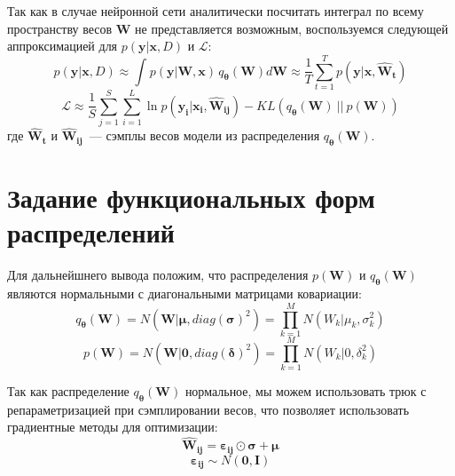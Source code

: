 \documentclass{article}
\numberwithin{equation}{section}
\begin{document}
    Так как в случае нейронной сети аналитически посчитать интеграл
    по всему пространству весов $\pmb{W}$ не представляется возможным,
    воспользуемся следующей аппроксимацией для $p(\pmb{y} | \pmb{x}, D)$ и $\mathcal{L}$:
    \begin{equation}
        p(\pmb{y} | \pmb{x}, D)
        \approx
            \int_{}{
                p(\pmb{y} | \pmb{W}, \pmb{x})
                \,
                q_{\pmb{\theta}}(\pmb{W})
                d\pmb{W}
            }
        \approx
            \frac{1}{T} \sum_{t=1}^{T}{
                p(\pmb{y} | \pmb{x}, \pmb{\hat{W}_{t}})
            }
    \end{equation}
    \begin{equation}\label{elbo_init}
        \mathcal{L}
        \approx
            \frac{1}{S} \sum_{j=1}^S \sum_{i=1}^{L} {
                \ln{
                    p(\pmb{y_{i}} | \pmb{x_{i}}, \pmb{\hat{W}_{ij}})
                }
            }
            -
            KL(q_{\pmb{\theta}}(\pmb{W})~||~p(\pmb{W}))
    \end{equation}
    где $\pmb{\hat{W}_{t}}$ и $\pmb{\hat{W}_{ij}}$~--- сэмплы весов модели из распределения
    $q_{\pmb{\theta}}(\pmb{W})$.

    \section{Задание функциональных форм распределений}
    Для дальнейшнего вывода положим,
    что распределения $p(\pmb{W})$ и $q_{\pmb{\theta}}(\pmb{W})$
    являются нормальными с диагональными матрицами ковариации:
    \begin{equation}
        q_{\pmb{\theta}}(\pmb{W})
        =
            N(
                \pmb{W} | \pmb{\mu}, diag(\pmb{\sigma})^{2}
            )
        =
            \prod_{k=1}^M
            N(
                W_k | \mu_k, \sigma_k^2
            )
    \end{equation}
    \begin{equation}
        p(\pmb{W})
        =
            N(
                \pmb{W} | \pmb{0}, diag(\pmb{\delta})^{2}
            )
        =
            \prod_{k=1}^M
            N(
                W_k | 0, \delta_k^2
            )
    \end{equation}

    Так как распределение $q_{\pmb{\theta}}(\pmb{W})$ нормальное,
    мы можем использовать трюк с репараметризацией при сэмплировании весов,
    что позволяет использовать градиентные методы для оптимизации:
    \begin{equation}\label{w_trick}
        \pmb{\hat{W}_{ij}}
        =
            \pmb{\varepsilon_{ij}}
            \odot
            \pmb{\sigma}
            +
            \pmb{\mu}
    \end{equation}
    \begin{equation}\label{eps_sample}
        \pmb{\varepsilon_{ij}} \sim N(\pmb{0}, \pmb{I})
    \end{equation}
\end{document}
